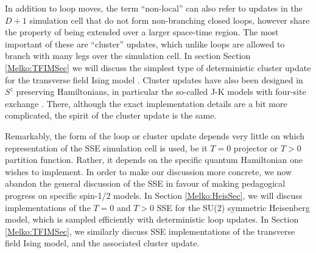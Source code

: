 \documentclass[vecphys]{svmult}
\begin{document}
In addition to loop moves, the term ``non-local'' can also refer to updates in the $D+1$ simulation cell that do not form non-branching closed loops, however share the property of being extended over a larger space-time region.  The most important of these are ``cluster'' updates,
which unlike loops are allowed to branch with many legs over the simulation cell.
In section Section \ref{Melko:TFIMSec} we will discuss the simplest type of deterministic cluster update for the transverse field Ising model \cite{Melko:Sandvik03}.  Cluster updates have also been designed in $S^z$ preserving Hamiltonians, in particular the so-called J-K models with four-site exchange \cite{Melko:JKqmc}.  There, although the exact implementation details are a bit more complicated, the spirit of the cluster update is the same.

Remarkably, the form of the loop or cluster update depends very little on which representation of the SSE simulation cell is used, be it $T=0$ projector or $T>0$ partition function.  Rather, it depends on the specific quantum Hamiltonian one wishes to implement.  In order to make our discussion more concrete, we now abandon the general discussion of the SSE in favour of making pedagogical progress on specific spin-1/2 models.  In Section  \ref{Melko:HeisSec}, we will discuss implementations of the $T=0$ and $T>0$ SSE for the SU(2) symmetric Heisenberg model, which is sampled efficiently with deterministic loop updates.  In Section  \ref{Melko:TFIMSec}, we similarly discuss SSE implementations of the transverse field Ising model, and the associated cluster update.



\end{document}
